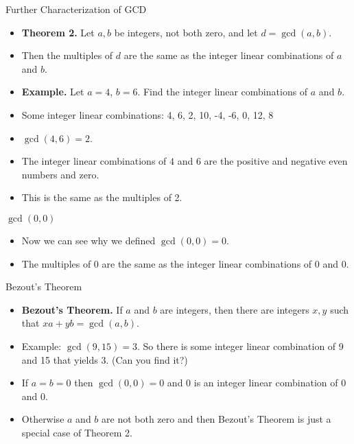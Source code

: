 \documentclass[handout]{beamer}
\begin{document}

\begin{frame}{Further Characterization of GCD}

\begin{itemize}
  \item \textbf{Theorem 2.} Let $a,b$ be integers, not both zero, and let $d=\gcd(a,b)$.
  \item Then the multiples of $d$ are the same as the integer linear combinations of $a$ and $b$.
  \item \textbf{Example.} Let $a=4$, $b=6$. Find the integer linear combinations of $a$ and $b$.
  \item Some integer linear combinations: 4, 6, 2, 10, -4, -6, 0, 12, 8
  \item $\gcd(4,6)=2$.
  \item The integer linear combinations of $4$ and $6$ are the positive and negative even numbers and zero.
  \item This is the same as the multiples of 2.
\end{itemize}

\end{frame}


\begin{frame}{$\gcd(0,0)$}

\begin{itemize}
  \item Now we can see why we defined $\gcd(0,0)=0$.
  \item The multiples of 0 are the same as the integer linear combinations of 0 and 0.
\end{itemize}

\end{frame}

\begin{frame}{Bezout's Theorem}

\begin{itemize}
  \item \textbf{Bezout's Theorem.} If $a$ and $b$ are integers, then there are integers $x,y$ such
  that $xa + yb = \gcd(a,b)$.
  \item Example: $\gcd(9,15) = 3$. So there is some integer linear combination of 9 and 15 that yields 3. (Can you find it?)
  \item If $a=b=0$ then $\gcd(0,0)=0$ and 0 is an integer linear combination of 0 and 0.
  \item Otherwise $a$ and $b$ are not both zero and then Bezout's Theorem is just a special case of Theorem 2.
\end{itemize}

\end{frame}
\end{document}

